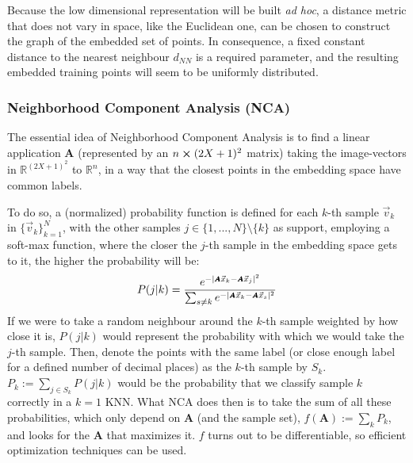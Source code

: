 \documentclass[11pt, a4paper, twoside]{article} %
\newcommand{\R}{\mathbb{R}} %
\DeclareRobustCommand{\mybox}[2][gray!10]{%
\begin{tcolorbox}[   %
        left=0.2cm,
        right=0.2cm,
        top=0.15cm,
        bottom=0.15cm,
        colback=#1,
        colframe=#1,
        width=\dimexpr\textwidth\relax, 
        enlarge left by=0mm,
        boxsep=5pt,
        arc=0pt,outer arc=0pt,
        ]
        #2
\end{tcolorbox}
}
\begin{document}
{Because the low dimensional representation will be built {\em ad hoc}, a distance metric that does not vary in space, like the Euclidean one, can be chosen to construct the graph of the embedded set of points. In consequence, a fixed constant distance to the nearest neighbour $d_{NN}$ is a required parameter, and the resulting embedded training points will seem to be uniformly distributed.
}\vspace{-0.45cm}

\subsubsection*{Neighborhood Component Analysis (NCA)}\vspace{-0.2cm}
The essential idea of Neighborhood Component Analysis \cite{NCA} is to find a linear application $\pmb{A}$ (represented by an $n\cross (2X+1)^2$ matrix) taking the image-vectors in $\R^{(2X+1)^2}$ to $\R^n$, in a way that the closest points in the embedding space have common labels. 

\mybox{To do so, a (normalized) probability function is defined for each $k$-th sample $\vec{v}_k$ in $\{\vec{v}_k\}_{k=1}^N$, with the other samples $j\in\{1,...,N\}\setminus\{k\}$ as support, employing a soft-max function, where the closer the $j$-th sample in the embedding space gets to it, the higher the probability will be:
\begin{equation}\small
P(j|k)=\frac{e^{-|\pmb{A}\vec{x}_k-\pmb{A}\vec{x}_j|^2} }{\sum_{s\neq k}e^{-|\pmb{A}\vec{x}_k-\pmb{A}\vec{x}_s|^2} }
\end{equation}
If we were to take a random neighbour around the $k$-th sample weighted by how close it is, $P(j|k)$ would represent the probability with which we would take the $j$-th sample. Then, denote the points with the same label (or close enough label for a defined number of decimal places) as the $k$-th sample by $S_k$. $P_k:=\sum_{j\in S_k}P(j|k)$ would be the probability that we classify sample $k$ correctly in a $k=1$ KNN. What NCA does then is to take the sum of all these probabilities, which only depend on $\pmb{A}$ (and the sample set), $f(\pmb{A}):=\sum_kP_k$, and looks for the $\pmb{A}$ that maximizes it. $f$ turns out to be differentiable, so efficient optimization techniques can be used.
}
\vspace{-0.45cm}
\end{document}
